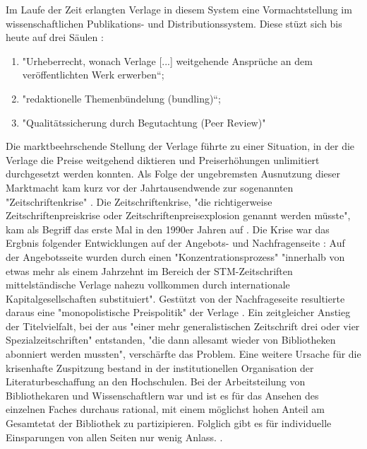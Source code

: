 Im Laufe der Zeit erlangten Verlage in diesem System eine Vormachtstellung im wissenschaftlichen Publikations- und Distributionssystem. Diese stüzt sich bis heute auf drei Säulen \cite{offhaus_2012_institutionelle_repos} \cite{bargheer_2006_open}: 
\begin{enumerate}
\item "Urheberrecht, wonach Verlage [...] weitgehende Ansprüche an dem veröffentlichten Werk erwerben“;
\item "redaktionelle Themenbündelung (bundling)“;
\item "Qualitätssicherung durch Begutachtung (Peer Review)"
\end{enumerate}

Die marktbeehrschende Stellung der Verlage führte zu einer Situation, in der die Verlage die Preise weitgehend diktieren und Preiserhöhungen unlimitiert durchgesetzt werden konnten. Als Folge der ungebremsten Ausnutzung dieser Marktmacht kam kurz vor der Jahrtausendwende zur sogenannten "Zeitschriftenkrise" \cite{schirmbacher_2009_wisspub} \cite{muller_2010_open}. Die Zeitschriftenkrise, "die richtigerweise Zeitschriftenpreiskrise oder Zeitschriftenpreisexplosion genannt werden müsste"\cite {Brintzinger_2010}, kam als Begriff das erste Mal in den 1990er Jahren auf \cite{Boni_2010}. Die Krise war das Ergbnis folgender Entwicklungen auf der Angebots- und Nachfragenseite \cite{Brintzinger_2010}: Auf der Angebotsseite wurden durch einen "Konzentrationsprozess" "innerhalb von etwas mehr als einem Jahrzehnt im Bereich der STM-Zeitschriften mittelständische Verlage nahezu vollkommen durch internationale Kapitalgesellschaften substituiert". \cite{Brintzinger_2010} Gestützt von der Nachfrageseite resultierte daraus eine "monopolistische Preispolitik" der Verlage \cite{Brintzinger_2010}. Ein zeitgleicher Anstieg der Titelvielfalt, bei der aus "einer mehr generalistischen Zeitschrift drei oder vier Spezialzeitschriften" entstanden, "die dann allesamt wieder von Bibliotheken abonniert werden mussten"\cite{Brintzinger_2010}, verschärfte das Problem. Eine weitere Ursache für die krisenhafte Zuspitzung bestand in der institutionellen Organisation der Literaturbeschaffung an den Hochschulen. Bei der Arbeitsteilung von Bibliothekaren und Wissenschaftlern war und ist es für das Ansehen des einzelnen Faches durchaus rational, mit einem möglichst hohen Anteil am Gesamtetat der Bibliothek zu partizipieren. Folglich gibt es für individuelle Einsparungen von allen Seiten nur wenig Anlass. \cite{Brintzinger_2010}.

